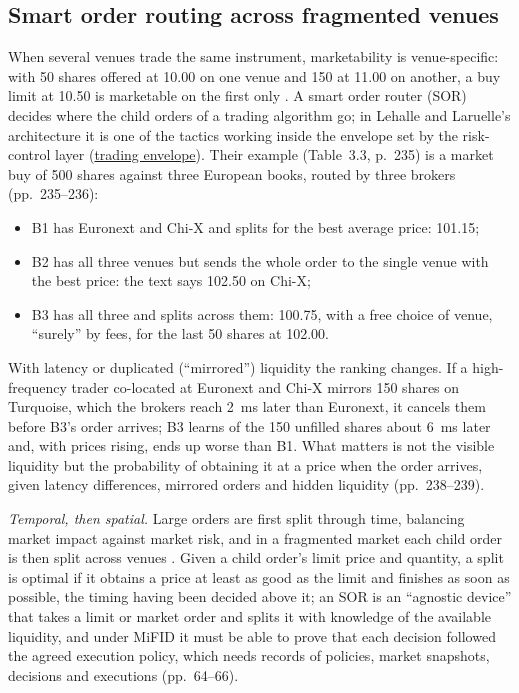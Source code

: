 \subsection{Smart order routing across fragmented venues}

\begin{qfdefinition}\label{def:smart-order-routing}
 When several venues trade the same instrument, marketability is venue-specific: with 50 shares offered at 10.00 on one venue and 150 at 11.00 on another, a buy limit at 10.50 is marketable on the first only \citep[sec.~3.4.2, pp.~233--234]{alpha-laruelle}. A smart order router (SOR) decides where the child orders of a trading algorithm go; in Lehalle and Laruelle's architecture it is one of the tactics working inside the envelope set by the risk-control layer (\hyperref[def:trading-envelope]{trading envelope}). Their example (Table~3.3, p.~235) is a market buy of 500 shares against three European books, routed by three brokers (pp.~235--236):
\begin{itemize}
\item B1 has Euronext and Chi-X and splits for the best average price: 101.15;
\item B2 has all three venues but sends the whole order to the single venue with the best price: the text says 102.50 on Chi-X;
\item B3 has all three and splits across them: 100.75, with a free choice of venue, ``surely'' by fees, for the last 50 shares at 102.00.
\end{itemize}
With latency or duplicated (``mirrored'') liquidity the ranking changes. If a high-frequency trader co-located at Euronext and Chi-X mirrors 150 shares on Turquoise, which the brokers reach 2~ms later than Euronext, it cancels them before B3's order arrives; B3 learns of the 150 unfilled shares about 6~ms later and, with prices rising, ends up worse than B1. What matters is not the visible liquidity but the probability of obtaining it at a price when the order arrives, given latency differences, mirrored orders and hidden liquidity (pp.~238--239).

\emph{Temporal, then spatial.} Large orders are first split through time, balancing market impact against market risk, and in a fragmented market each child order is then split across venues \citep[chap.~1, sec.~1.2.1, pp.~62--64]{alpha-laruelle}. Given a child order's limit price and quantity, a split is optimal if it obtains a price at least as good as the limit and finishes as soon as possible, the timing having been decided above it; an SOR is an ``agnostic device'' that takes a limit or market order and splits it with knowledge of the available liquidity, and under MiFID it must be able to prove that each decision followed the agreed execution policy, which needs records of policies, market snapshots, decisions and executions (pp.~64--66).


\end{qfdefinition}
